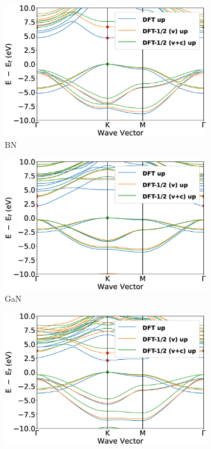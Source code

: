 \begin{figure}[!ht]
\begin{subfigure}{0.3\textwidth}
  \includegraphics[width=\linewidth]{images/band_2d_bn.eps}
  \caption{BN}
\end{subfigure}\hfil %
\begin{subfigure}{0.3\textwidth}
  \includegraphics[width=\linewidth]{images/band_2d_gan.eps}
  \caption{GaN}
\end{subfigure}\hfil %
\begin{subfigure}{0.3\textwidth}
  \includegraphics[width=\linewidth]{images/band_2d_gec.eps}

\end{subfigure}
\end{figure}
